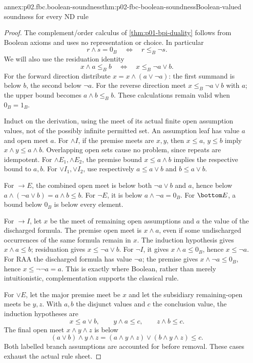 \begin{annexitem}{annex:p02.fbc.boolean-soundness}{thm:p02-fbc-boolean-soundness}{Boolean-valued soundness for every ND rule}
\begin{proof}
The complement/order calculus of \cref{thm:p01-bpi-duality} follows
from Boolean axioms and uses no representation or choice.
In particular
\[
 r\wedge s=0_B\quad\Longleftrightarrow\quad r\leq_B\neg s.
\]
We will also use the residuation identity
\[
 x\wedge a\leq_B b
       \quad\Longleftrightarrow\quad x\leq_B\neg a\vee b.
\]
For the forward direction distribute
\(x=x\wedge(a\vee\neg a)\):
the first summand is below \(b\), the second below \(\neg a\).
For the reverse direction meet \(x\leq_B\neg a\vee b\) with \(a\);
the upper bound becomes \(a\wedge b\leq_B b\).
These calculations remain valid when \(0_B=1_B\).

Induct on the derivation, using the meet of its actual finite open
assumption values, not of the possibly infinite permitted set.
An assumption leaf has value \(a\) and open meet \(a\).
For \(\land I\), if the premise meets are \(x,y\), then
\(x\leq a\), \(y\leq b\) imply \(x\wedge y\leq a\wedge b\).
Overlapping open sets cause no problem, since repeats are idempotent.
For \(\land E_1,\land E_2\), the premise bound
\(x\leq a\wedge b\) implies the respective bound to \(a,b\).
For \(\lor I_1,\lor I_2\), use respectively
\(a\leq a\vee b\) and \(b\leq a\vee b\).

For \(\to E\), the combined open meet is below both
\(\neg a\vee b\) and \(a\), hence below
\(a\wedge(\neg a\vee b)=a\wedge b\leq b\).
For \(\neg E\), it is below \(a\wedge\neg a=0_B\).
For \(\bottom E\), a bound below \(0_B\) is below every element.

For \(\to I\), let \(x\) be the meet of remaining open
assumptions and \(a\) the value of the discharged formula.
The premise open meet is \(x\wedge a\), even if some
undischarged occurrences of the same formula remain in \(x\).
The induction hypothesis gives \(x\wedge a\leq b\);
residuation gives \(x\leq\neg a\vee b\).
For \(\neg I\), it gives \(x\wedge a\leq0_B\), hence
\(x\leq\neg a\).
For RAA the discharged formula has value \(\neg a\);
the premise gives \(x\wedge\neg a\leq0_B\), hence
\(x\leq\neg\neg a=a\).
This is exactly where Boolean, rather than merely intuitionistic,
complementation supports the classical rule.

For \(\lor E\), let the major premise meet be \(x\) and let
the subsidiary remaining-open meets be \(y,z\).
With \(a,b\) the disjunct values and \(c\) the conclusion value,
the induction hypotheses are
\[
 x\leq a\vee b,\qquad y\wedge a\leq c,\qquad
 z\wedge b\leq c.
\]
The final open meet \(x\wedge y\wedge z\) is below
\[
 (a\vee b)\wedge y\wedge z
       =(a\wedge y\wedge z)\vee(b\wedge y\wedge z)
       \leq c.
\]
Both labelled branch assumptions are accounted for before removal.
These cases exhaust the actual rule sheet.


\end{proof}
\end{annexitem}
